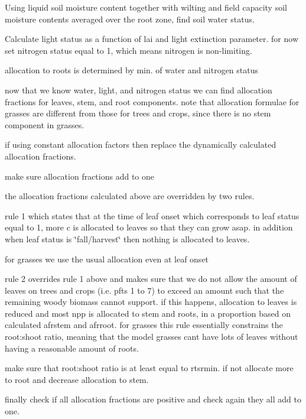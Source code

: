 Using liquid soil moisture content together with wilting and field capacity soil moisture contents averaged over the root zone, find soil water status.

Calculate light status as a function of lai and light extinction parameter. for now set nitrogen status equal to 1, which means nitrogen is non-\/limiting.

allocation to roots is determined by min. of water and nitrogen status

now that we know water, light, and nitrogen status we can find allocation fractions for leaves, stem, and root components. note that allocation formulae for grasses are different from those for trees and crops, since there is no stem component in grasses.

if using constant allocation factors then replace the dynamically calculated allocation fractions.

make sure allocation fractions add to one

the allocation fractions calculated above are overridden by two rules.

rule 1 which states that at the time of leaf onset which corresponds to leaf status equal to 1, more c is allocated to leaves so that they can grow asap. in addition when leaf status is \char`\"{}fall/harvest\char`\"{} then nothing is allocated to leaves.

for grasses we use the usual allocation even at leaf onset

rule 2 overrides rule 1 above and makes sure that we do not allow the amount of leaves on trees and crops (i.\+e. pfts 1 to 7) to exceed an amount such that the remaining woody biomass cannot support. if this happens, allocation to leaves is reduced and most npp is allocated to stem and roots, in a proportion based on calculated afrstem and afrroot. for grasses this rule essentially constrains the root\+:shoot ratio, meaning that the model grasses can\textquotesingle{}t have lots of leaves without having a reasonable amount of roots.

make sure that root\+:shoot ratio is at least equal to rtsrmin. if not allocate more to root and decrease allocation to stem.

finally check if all allocation fractions are positive and check again they all add to one.